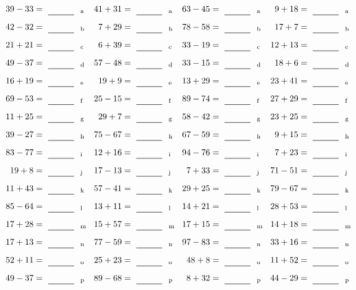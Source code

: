 \documentclass
[
  draft    = true,
  fontsize = 11pt,
  parskip  = half-
]
{scrartcl}
\begin{document}
\clearpage
\begin{align*}
    \pline{39-33}&=\rline{a}
  & \pline{41+31}&=\rline{a}
  & \pline{63-45}&=\rline{a}
  & \pline{9+18}&=\rline{a} \\[1ex]
    \pline{42-32}&=\rline{b}
  & \pline{7+29}&=\rline{b}
  & \pline{78-58}&=\rline{b}
  & \pline{17+7}&=\rline{b} \\[1ex]
    \pline{21+21}&=\rline{c}
  & \pline{6+39}&=\rline{c}
  & \pline{33-19}&=\rline{c}
  & \pline{12+13}&=\rline{c} \\[1ex]
    \pline{49-37}&=\rline{d}
  & \pline{57-48}&=\rline{d}
  & \pline{33-15}&=\rline{d}
  & \pline{18+6}&=\rline{d} \\[1ex]
    \pline{16+19}&=\rline{e}
  & \pline{19+9}&=\rline{e}
  & \pline{13+29}&=\rline{e}
  & \pline{23+41}&=\rline{e} \\[1ex]
    \pline{69-53}&=\rline{f}
  & \pline{25-15}&=\rline{f}
  & \pline{89-74}&=\rline{f}
  & \pline{27+29}&=\rline{f} \\[1ex]
    \pline{11+25}&=\rline{g}
  & \pline{29+7}&=\rline{g}
  & \pline{58-42}&=\rline{g}
  & \pline{23+25}&=\rline{g} \\[1ex]
    \pline{39-27}&=\rline{h}
  & \pline{75-67}&=\rline{h}
  & \pline{67-59}&=\rline{h}
  & \pline{9+15}&=\rline{h} \\[1ex]
    \pline{83-77}&=\rline{i}
  & \pline{12+16}&=\rline{i}
  & \pline{94-76}&=\rline{i}
  & \pline{7+23}&=\rline{i} \\[1ex]
    \pline{19+8}&=\rline{j}
  & \pline{17-13}&=\rline{j}
  & \pline{7+33}&=\rline{j}
  & \pline{71-51}&=\rline{j} \\[1ex]
    \pline{11+43}&=\rline{k}
  & \pline{57-41}&=\rline{k}
  & \pline{29+25}&=\rline{k}
  & \pline{79-67}&=\rline{k} \\[1ex]
    \pline{85-64}&=\rline{l}
  & \pline{13+11}&=\rline{l}
  & \pline{14+21}&=\rline{l}
  & \pline{28+53}&=\rline{l} \\[1ex]
    \pline{17+28}&=\rline{m}
  & \pline{15+57}&=\rline{m}
  & \pline{17+15}&=\rline{m}
  & \pline{14+18}&=\rline{m} \\[1ex]
    \pline{17+13}&=\rline{n}
  & \pline{77-59}&=\rline{n}
  & \pline{97-83}&=\rline{n}
  & \pline{33+16}&=\rline{n} \\[1ex]
    \pline{52+11}&=\rline{o}
  & \pline{25+23}&=\rline{o}
  & \pline{48+8}&=\rline{o}
  & \pline{11+52}&=\rline{o} \\[1ex]
    \pline{49-37}&=\rline{p}
  & \pline{89-68}&=\rline{p}
  & \pline{8+32}&=\rline{p}
  & \pline{44-29}&=\rline{p}
\end{align*}
\end{document}
